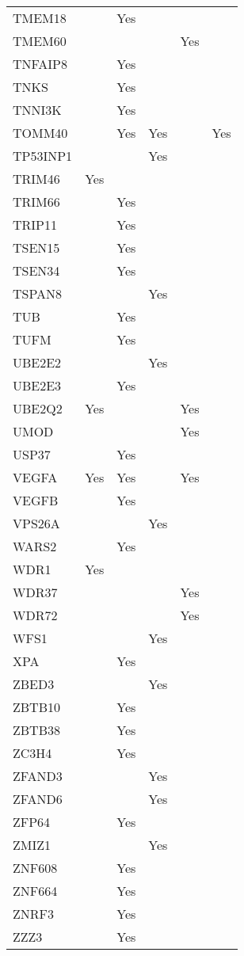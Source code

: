 \documentclass[]{report}
\begin{document}
\begin{longtable}[t]{llllll}
TMEM18 &  & Yes &  &  & \\
TMEM60 &  &  &  & Yes & \\
TNFAIP8 &  & Yes &  &  & \\
TNKS &  & Yes &  &  & \\
TNNI3K &  & Yes &  &  & \\
TOMM40 &  & Yes & Yes &  & Yes\\
TP53INP1 &  &  & Yes &  & \\
TRIM46 & Yes &  &  &  & \\
TRIM66 &  & Yes &  &  & \\
TRIP11 &  & Yes &  &  & \\
TSEN15 &  & Yes &  &  & \\
TSEN34 &  & Yes &  &  & \\
TSPAN8 &  &  & Yes &  & \\
TUB &  & Yes &  &  & \\
TUFM &  & Yes &  &  & \\
UBE2E2 &  &  & Yes &  & \\
UBE2E3 &  & Yes &  &  & \\
UBE2Q2 & Yes &  &  & Yes & \\
UMOD &  &  &  & Yes & \\
USP37 &  & Yes &  &  & \\
VEGFA & Yes & Yes &  & Yes & \\
VEGFB &  & Yes &  &  & \\
VPS26A &  &  & Yes &  & \\
WARS2 &  & Yes &  &  & \\
WDR1 & Yes &  &  &  & \\
WDR37 &  &  &  & Yes & \\
WDR72 &  &  &  & Yes & \\
WFS1 &  &  & Yes &  & \\
XPA &  & Yes &  &  & \\
ZBED3 &  &  & Yes &  & \\
ZBTB10 &  & Yes &  &  & \\
ZBTB38 &  & Yes &  &  & \\
ZC3H4 &  & Yes &  &  & \\
ZFAND3 &  &  & Yes &  & \\
ZFAND6 &  &  & Yes &  & \\
ZFP64 &  & Yes &  &  & \\
ZMIZ1 &  &  & Yes &  & \\
ZNF608 &  & Yes &  &  & \\
ZNF664 &  & Yes &  &  & \\
ZNRF3 &  & Yes &  &  & \\
ZZZ3 &  & Yes &  &  & \\*
\end{longtable}
\end{document}
